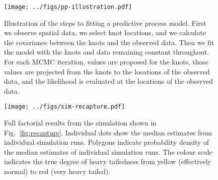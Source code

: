\documentclass[12pt,english]{article}
\begin{document}
\begin{figure}[htb]
  \begin{center}
    \texttt{[image: ../figs/pp-illustration.pdf]}
    \caption{
      Illustration of the steps to fitting a predictive process model.
      First we observe spatial data, we select knot locations,
      and we calculate the covariance between the knots and the observed data.
      Then we fit the model with the knots and data remaining constant throughout.
      For each MCMC iteration, values are proposed for the
      knots, those values are projected from the knots to the locations of the observed data,
      and the likelihood is evaluated at the locations of the observed data.}
    \label{fig:didactic}
  \end{center}
\end{figure}

\clearpage

\begin{figure}[htb]
  \begin{center}
    \texttt{[image: ../figs/sim-recapture.pdf]}
    \caption{
      Full factorial results from the simulation shown in Fig.~\ref{fig:recapture}.
      Individual dots show the median estimates from individual simulation runs.
      Polygons indicate probability density of the median estimates of
      individual simulation runs.
      The colour scale indicates the true degree of heavy tailedness from
      yellow (effectively normal) to red (very heavy tailed).
    }
    \label{fig:recapture-factorial}
  \end{center}
\end{figure}

\renewcommand\theadfont{\scriptsize}
\renewcommand\theadalign{cl}
\end{document}
